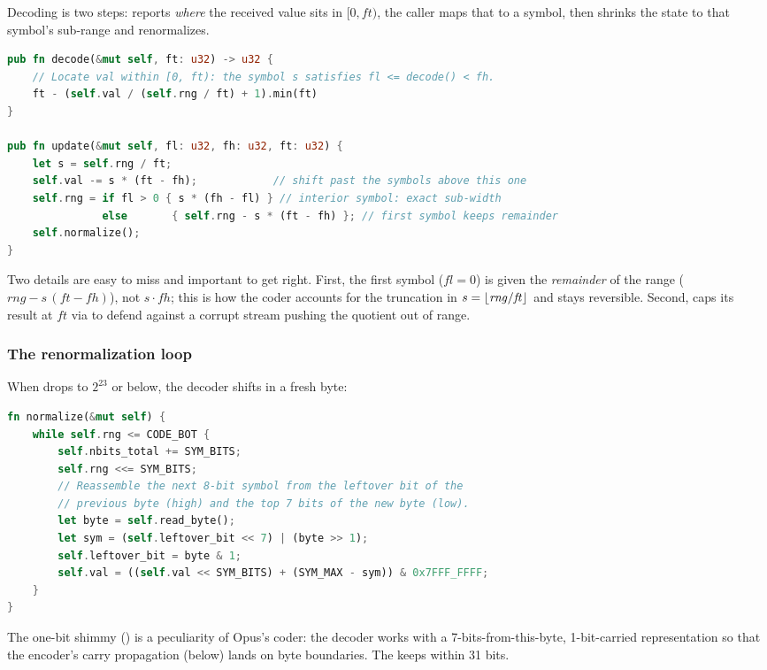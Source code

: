 Decoding is two steps:  reports \emph{where} the received value
sits in $[0, \mathit{ft})$, the caller maps that to a symbol, then 
shrinks the state to that symbol's sub-range and renormalizes.

\begin{lstlisting}[language=Rust]
pub fn decode(&mut self, ft: u32) -> u32 {
    // Locate val within [0, ft): the symbol s satisfies fl <= decode() < fh.
    ft - (self.val / (self.rng / ft) + 1).min(ft)
}

pub fn update(&mut self, fl: u32, fh: u32, ft: u32) {
    let s = self.rng / ft;
    self.val -= s * (ft - fh);            // shift past the symbols above this one
    self.rng = if fl > 0 { s * (fh - fl) } // interior symbol: exact sub-width
               else       { self.rng - s * (ft - fh) }; // first symbol keeps remainder
    self.normalize();
}
\end{lstlisting}

Two details are easy to miss and important to get right. First, the first symbol
($\mathit{fl}=0$) is given the \emph{remainder} of the range
($\mathit{rng} - s\,(\mathit{ft}-\mathit{fh})$), not
$s\cdot\mathit{fh}$; this is
how the coder accounts for the truncation in $s = \floor*{\mathit{rng}/
\mathit{ft}}$ and stays reversible. Second,  caps its result at
$\mathit{ft}$ via  to defend against a corrupt stream pushing the
quotient out of range.

\subsubsection{The renormalization loop}

When  drops to $2^{23}$ or below, the decoder shifts in a fresh byte:

\begin{lstlisting}[language=Rust]
fn normalize(&mut self) {
    while self.rng <= CODE_BOT {
        self.nbits_total += SYM_BITS;
        self.rng <<= SYM_BITS;
        // Reassemble the next 8-bit symbol from the leftover bit of the
        // previous byte (high) and the top 7 bits of the new byte (low).
        let byte = self.read_byte();
        let sym = (self.leftover_bit << 7) | (byte >> 1);
        self.leftover_bit = byte & 1;
        self.val = ((self.val << SYM_BITS) + (SYM_MAX - sym)) & 0x7FFF_FFFF;
    }
}
\end{lstlisting}

The one-bit shimmy () is a peculiarity of Opus's coder: the
decoder works with a 7-bits-from-this-byte, 1-bit-carried representation so that
the encoder's carry propagation (below) lands on byte boundaries. The
 keeps  within 31 bits.

